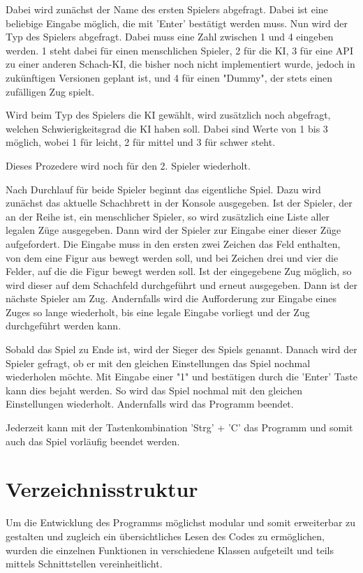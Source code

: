 Dabei wird zunächst der Name des ersten Spielers abgefragt. Dabei ist
eine beliebige Eingabe möglich, die mit 'Enter' bestätigt werden muss.
Nun wird der Typ des Spielers abgefragt. Dabei muss eine Zahl zwischen 1
und 4 eingeben werden. 1 steht dabei für einen menschlichen Spieler, 2
für die KI, 3 für eine API zu einer anderen Schach-KI, die bisher noch
nicht implementiert wurde, jedoch in zukünftigen Versionen geplant ist,
und 4 für einen "Dummy", der stets einen zufälligen Zug spielt.

Wird beim Typ des Spielers die KI gewählt, wird zusätzlich noch
abgefragt, welchen Schwierigkeitsgrad die KI haben soll. Dabei sind
Werte von 1 bis 3 möglich, wobei 1 für leicht, 2 für mittel und 3 für
schwer steht.

Dieses Prozedere wird noch für den 2. Spieler wiederholt.

Nach Durchlauf für beide Spieler beginnt das eigentliche Spiel. Dazu
wird zunächst das aktuelle Schachbrett in der Konsole ausgegeben. Ist
der Spieler, der an der Reihe ist, ein menschlicher Spieler, so wird
zusätzlich eine Liste aller legalen Züge ausgegeben. Dann wird der
Spieler zur Eingabe einer dieser Züge aufgefordert. Die Eingabe muss in
den ersten zwei Zeichen das Feld enthalten, von dem eine Figur aus
bewegt werden soll, und bei Zeichen drei und vier die Felder, auf die
die Figur bewegt werden soll. Ist der eingegebene Zug möglich, so wird
dieser auf dem Schachfeld durchgeführt und erneut ausgegeben. Dann ist
der nächste Spieler am Zug. Andernfalls wird die Aufforderung zur
Eingabe eines Zuges so lange wiederholt, bis eine legale Eingabe
vorliegt und der Zug durchgeführt werden kann.

Sobald das Spiel zu Ende ist, wird der Sieger des Spiels genannt. Danach
wird der Spieler gefragt, ob er mit den gleichen Einstellungen das Spiel
nochmal wiederholen möchte. Mit Eingabe einer "1" und bestätigen durch
die 'Enter' Taste kann dies bejaht werden. So wird das Spiel nochmal mit
den gleichen Einstellungen wiederholt. Andernfalls wird das Programm
beendet.

Jederzeit kann mit der Tastenkombination 'Strg' + 'C' das Programm und
somit auch das Spiel vorläufig beendet werden.

    \section{Verzeichnisstruktur}\label{verzeichnisstruktur}

Um die Entwicklung des Programms möglichst modular und somit erweiterbar
zu gestalten und zugleich ein übersichtliches Lesen des Codes zu
ermöglichen, wurden die einzelnen Funktionen in verschiedene Klassen
aufgeteilt und teils mittels Schnittstellen vereinheitlicht.

